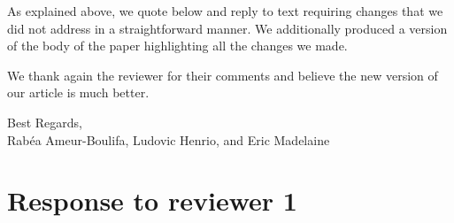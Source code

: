 \documentclass[10pt]{article}
\begin{document}
As explained above, we quote below and reply to text requiring changes that we did not  address in a straightforward manner. We additionally produced a version of the body of the  paper highlighting all the changes we made.

We thank again the reviewer for their comments and believe the new version of our article  is much better.

\begin{flushright}
  Best Regards,\\
  Rab\'ea Ameur-Boulifa, Ludovic Henrio, and Eric Madelaine
\end{flushright}

\newpage

\section*{Response to reviewer 1}
\end{document}
